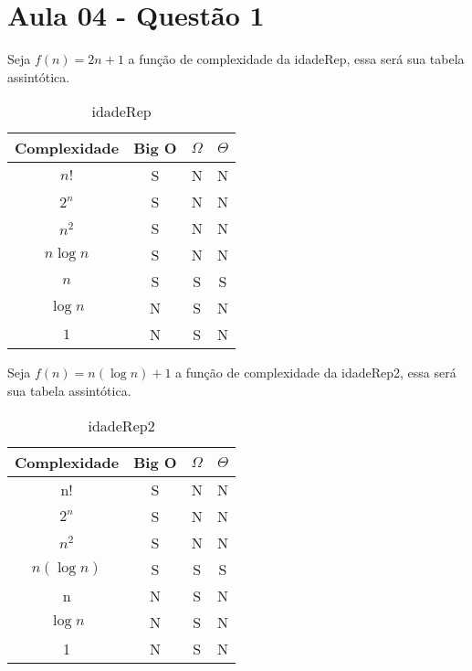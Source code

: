 \section{Aula 04 - Questão 1}

Seja $f(n) = 2n + 1$ a função de complexidade da idadeRep, essa será sua tabela assintótica. 

\begin{table}[ht!]
    \centering
    \begin{tabular}{|c|c|c|c|}
    \hline
    \textbf{Complexidade} & \textbf{Big O} & $\Omega$ & $\Theta$ \\ \hline
    $n!$ & S & N & N \\ \hline
    $2^n$ & S & N & N \\ \hline
    $n^2$ & S & N & N \\ \hline
    $n\log n$ & S & N & N \\ \hline
    $n$ & S & S & S \\ \hline
    $\log n$ & N & S & N \\ \hline
    $1$ & N & S & N \\ \hline 
    \end{tabular}
    \caption{idadeRep}
\end{table}

Seja $f(n) = n(\log n) + 1$ a função de complexidade da idadeRep2, essa será sua tabela assintótica. 

\begin{table}[ht!]
    \centering
    \begin{tabular}{|c|c|c|c|}
    \hline
    \textbf{Complexidade} & \textbf{Big O} & $\Omega$ & $\Theta$ \\ \hline
    n! & S & N & N \\ \hline
    $2^n$ & S & N & N \\ \hline
    $n^2$ & S & N & N \\ \hline
    $n(\log n)$ & S & S & S \\ \hline
    n & N & S & N \\ \hline
    $\log n$ & N & S & N \\ \hline
    1 & N & S & N \\ \hline 
    \end{tabular}
    \caption{idadeRep2}
\end{table}
